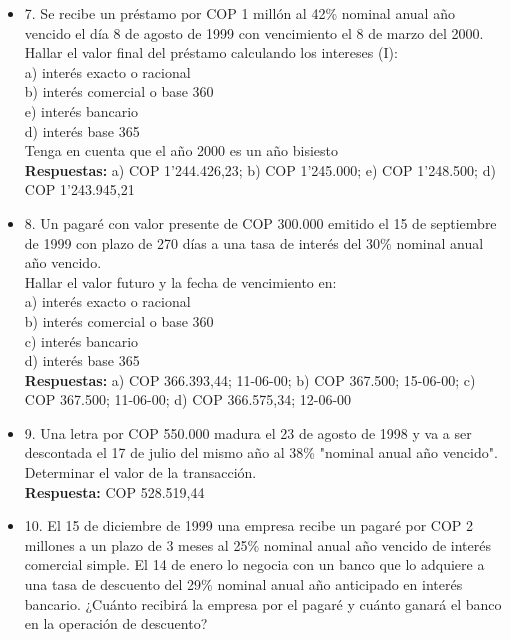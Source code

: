 \begin{itemize}
 \item 7. Se recibe un préstamo por  COP  1 millón al 42\% nominal anual año vencido el día 8 de agosto de 1999 con vencimiento el 8 de marzo del 2000. Hallar el valor final del préstamo calculando los intereses (I):\\

       a) interés exacto o racional\\
       b) interés comercial o base 360\\
       e) interés bancario\\
       d) interés base 365\\
       Tenga en cuenta que el año 2000 es un año bisiesto\\
       \textbf{ Respuestas:} a) COP 1'244.426,23; b) COP 1'245.000; e) COP 1'248.500; d) COP 1'243.945,21
       \medskip

 \item 8. Un pagaré con valor presente de  COP  300.000 emitido el 15 de septiembre de 1999 con plazo de 270 días a una tasa de interés del 30\% nominal anual año vencido.\\
       Hallar el valor futuro y la fecha de vencimiento en:\\

       a) interés exacto o racional\\
       b) interés comercial o base 360\\
       c) interés bancario\\
       d) interés base 365\\
       \textbf{Respuestas:} a) COP 366.393,44; 11-06-00; b) COP 367.500; 15-06-00; c) COP 367.500; 11-06-00; d) COP 366.575,34; 12-06-00
       \medskip

 \item 9. Una letra por COP 550.000 madura el 23 de agosto de 1998 y va a ser descontada el 17 de julio del mismo año al 38\% "nominal anual año vencido". Determinar el valor de la transacción.\\
       \textbf{Respuesta:} COP 528.519,44
       \medskip

 \item 10. El 15 de diciembre de 1999 una empresa recibe un pagaré por  COP  2 millones a un plazo de 3 meses al 25\% nominal anual año vencido de interés comercial simple. El 14 de enero lo negocia con un banco que lo adquiere a una tasa de descuento del 29\% nominal anual año anticipado en interés bancario. ¿Cuánto recibirá la empresa por el pagaré y cuánto ganará el banco en la operación de descuento?\\


\end{itemize}
